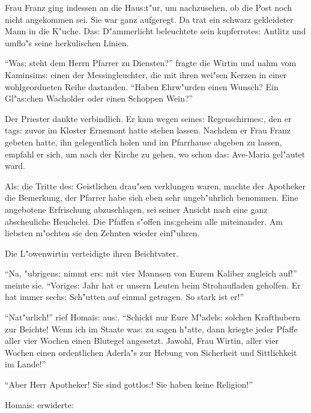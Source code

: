 \documentclass[oneside,12pt]{book}
\newcommand{\s}{s:}%
\begin{document}
Frau Franz ging indessen an die Hau{\s}t"ur, um nachzusehen, ob
die Post noch nicht angekommen sei. Sie war ganz aufgeregt. Da
trat ein schwarz gekleideter Mann in die K"uche. Da{\s}
D"ammerlicht beleuchtete sein kupferrote{\s} Antlitz und umflo"s
seine herkulischen Linien.

"`Wa{\s} steht dem Herrn Pfarrer zu Diensten?"' fragte die Wirtin
und nahm vom Kaminsim{\s} einen der Messingleuchter, die mit ihren
wei"sen Kerzen in einer wohlgeordneten Reihe dastanden. "`Haben
Ehrw"urden einen Wunsch? Ein Gl"a{\s}chen Wacholder oder einen
Schoppen Wein?"'

Der Priester dankte verbindlich. Er kam wegen seine{\s}
Regenschirme{\s}, den er tag{\s} zuvor im Kloster Ernemont hatte
stehen lassen. Nachdem er Frau Franz gebeten hatte, ihn
gelegentlich holen und im Pfarrhause abgeben zu lassen, empfahl er
sich, um nach der Kirche zu gehen, wo schon da{\s} Ave-Maria
gel"autet ward.

Al{\s} die Tritte de{\s} Geistlichen drau"sen verklungen waren,
machte der Apotheker die Bemerkung, der Pfarrer habe sich eben
sehr ungeb"uhrlich benommen. Eine angebotene Erfrischung
abzuschlagen, sei seiner Ansicht nach eine ganz abscheuliche
Heuchelei. Die Pfaffen s"offen in{\s}geheim alle miteinander. Am
liebsten m"ochten sie den Zehnten wieder einf"uhren.

Die L"owenwirtin verteidigte ihren Beichtvater.

"`Na, "ubrigen{\s} nimmt er{\s} mit vier Mannsen von Eurem Kaliber
zugleich auf!"' meinte sie. "`Vorige{\s} Jahr hat er unsern Leuten
beim Strohaufladen geholfen. Er hat immer sech{\s} Sch"utten auf
einmal getragen. So stark ist er!"'

"`Nat"urlich!"' rief Homai{\s} au{\s}. "`Schickt nur Eure
M"adel{\s} solchen Krafthubern zur Beichte! Wenn ich im Staate
wa{\s} zu sagen h"atte, dann kriegte jeder Pfaffe aller vier
Wochen einen Blutegel angesetzt. Jawohl, Frau Wirtin, aller vier
Wochen einen ordentlichen Aderla"s zur Hebung von Sicherheit und
Sittlichkeit im Lande!"'

"`Aber Herr Apotheker! Sie sind gottlo{\s}! Sie haben keine Religion!"'

Homai{\s} erwiderte:
\end{document}
